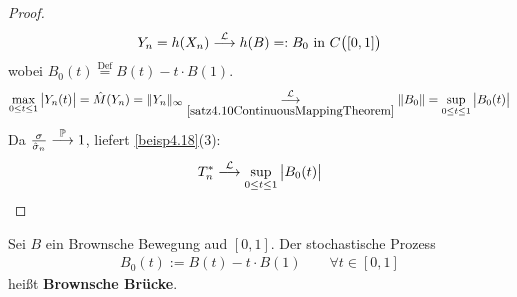 \begin{proof}
	\begin{align*}
		Y_n=h(X_n)\stackrel{\L}{\longrightarrow} h(B)=:B_0\text{ in }C\big([0,1]\big)
	\end{align*}
	wobei $B_0(t)\overset{\text{Def}}{=}B(t)-t\cdot B(1)$.
	\begin{align*}
		\max\limits_{0\leq t\leq 1}\big|Y_n(t)\big|=\hat{M}(Y_n)=\Vert Y_n\Vert_\infty
		\stackrelnew{\ref{satz4.10ContinuousMappingTheorem}}{\L}{\longrightarrow}
		\Vert B_0\Vert=\sup\limits_{0\leq t\leq 1}\big|B_0(t)\big|
	\end{align*}
	Da $\frac{\sigma}{\hat{\sigma}_n}\stackrel{\P}{\longrightarrow}1$, liefert \ref{beisp4.18}(3):
	\begin{align*}
		T_n^\ast\stackrel{\L}{\longrightarrow}\sup\limits_{0\leq t\leq 1}\big|B_0(t)\big|
	\end{align*}
\end{proof}

\begin{definition} %
	Sei $B$ ein Brownsche Bewegung aud $[0,1]$. Der stochastische Prozess
	\begin{align*}
		B_0(t):=B(t)-t\cdot B(1)\qquad\forall t\in[0,1]
	\end{align*}
	heißt \textbf{Brownsche Brücke}.
\end{definition}



